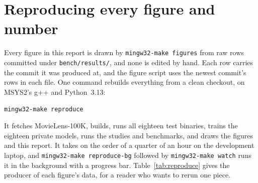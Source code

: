 \section{Reproducing every figure and number}
\label{app:reproduce}

Every figure in this report is drawn by \texttt{mingw32-make figures} from raw
rows committed under \texttt{bench/results/}, and none is edited by hand. Each
row carries the commit it was produced at, and the figure script uses the newest
commit's rows in each file. One command rebuilds everything from a clean
checkout, on MSYS2's g++ and Python~3.13:
%
\begin{center}
\texttt{mingw32-make reproduce}
\end{center}
%
It fetches MovieLens-100K, builds, runs all eighteen test binaries, trains the
eighteen private models, runs the studies and benchmarks, and draws the figures
and this report. It takes on the order of a quarter of an hour on the
development laptop, and
\texttt{mingw32-make reproduce-bg} followed by \texttt{mingw32-make watch} runs it
in the background with a progress bar. Table~\ref{tab:reproduce} gives the
producer of each figure's data, for a reader who wants to rerun one piece.

